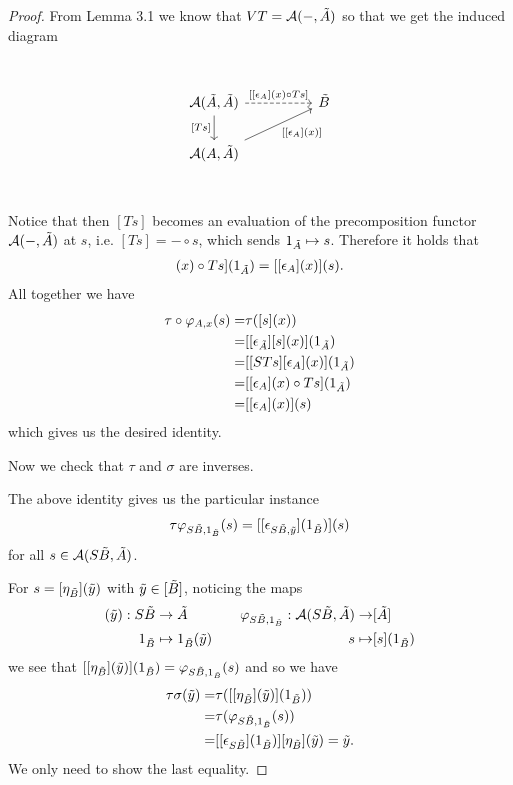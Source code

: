 \documentclass[12pt,a4paper]{article}
\def\HomA{\ensuremath\mathcal{A}}
\def\t{\ensuremath\tilde}
\begin{document}
\begin{proof}
From Lemma 3.1 we know that $VT = \HomA(-, \t A)$ so that we get the induced diagram
\[\begin{tikzcd}
	&& {} \\
	{\HomA(\t A, \t A)} && {\t B} \\
	{\HomA(A, \t A)}\\
	\arrow["{[[\epsilon_A](x)\circ Ts]}", dashed, from=2-1, to=2-3]
	\arrow["\text{[$Ts$]}"', from=2-1, to=3-1]
	\arrow["{[[\epsilon_A](x)]}"', from=3-1, to=2-3]
\end{tikzcd}\]
Notice that then $[Ts]$ becomes an evaluation of the precomposition functor $\HomA(-, \t A)$ at $s$, i.e. $[Ts] = - \circ s$, which sends $1_{\t A} \mapsto s$. Therefore it holds that \begin{align*}
 	[[\epsilon_A](x)\circ Ts](1_{\t A})=[[\epsilon_A](x)](s).
 \end{align*}
 All together we have \begin{align*}
 	\tau \circ \varphi_{A,x}(s)= &\tau([s](x))\\
 	=&[[\epsilon_{\t A}][s](x)](1_{\t A})\\
 	 =& [[STs][\epsilon_A](x)](1_{\t A})
 	\\=&[[\epsilon_A](x)\circ Ts](1_{\t A})\\
 	=&[[\epsilon_A](x)](s)
 \end{align*}
 which gives us the desired identity.
 
 Now we check that $\tau$ and $\sigma$ are inverses. 
 
 The above identity gives us the particular instance \begin{align*}
 	\tau \varphi_{S\t B, 1_{\t B}}(s) = [[\epsilon_{S\t B,\t y}](1_{\t B})](s)
 \end{align*}
 for all $s \in \HomA(S\t B, \t A)$.
 
 For $s = [\eta_{\t B}](\t y)$ with $\t y \in [\t B]$, noticing the maps \begin{align*}
 	[\eta_{\t B}](\t y): S\t B &\to \t A & \ \ \ \varphi_{S\t B, 1_{\t B}}: \HomA(S\t B, \t A) \to & [\t A]\\
 	1_{\t B} &\mapsto 1_{\t B}(\t y)& s \mapsto& [s](1_{\t B})
 \end{align*}
 we see that $[[\eta_{\t B}](\t y)](1_{\t B}) = \varphi_{S \t B, 1_{\t B}}(s)$ and so we  have \begin{align*}
 	\tau \sigma (\t y) =& \tau ( [[\eta_{\t B}](\t y)](1_{\t B}))\\
 	 =&  \tau(\varphi_{S\t B, 1_{\t B}}(s))\\
 	 =& [[\epsilon_{S\t B}](1_{\t B})][\eta_{\t B}](\t y) = \t y.
 \end{align*}
 We only need to show the last equality. 
 

\end{proof}
\end{document}
